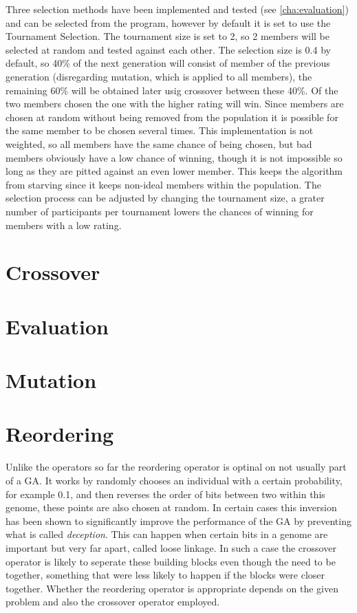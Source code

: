 Three selection methods have been implemented and tested (see \ref{cha:evaluation}) and can be selected from the program, however by default it is set to use the Tournament Selection. The tournament size is set to 2, so 2 members will be selected at random and tested against each other. The selection size is 0.4 by default, so 40\% of the next generation will consist of member of the previous generation (disregarding mutation, which is applied to all members), the remaining 60\% will be obtained later usig crossover between these 40\%. Of the two members chosen the one with the higher rating will win. Since members are chosen at random without being removed from the population it is possible for the same member to be chosen several times. This implementation is not weighted, so all members have the same chance of being chosen, but bad members obviously have a low chance of winning, though it is not impossible so long as they are pitted against an even lower member. This keeps the algorithm from starving since it keeps non-ideal members within the population. The selection process can be adjusted by changing the tournament size, a grater number of participants per tournament lowers the chances of winning for members with a low rating.

\section{Crossover} %
\label{sec:crossover}



\section{Evaluation} %
\label{sec:evaluation}



\section{Mutation} %
\label{sec:mutation}



\section{Reordering}
\label{sec:reordering}

Unlike the operators so far the reordering operator is optinal on not usually part of a GA. It works by randomly chooses an individual with a certain probability, for example 0.1, and then reverses the order of bits between two within this genome, these points are also chosen at random. In certain cases this inversion has been shown to significantly improve the performance of the GA by preventing what is called \textit{deception}\cite{8}. This can happen when certain bits in a genome are important but very far apart, called loose linkage. In such a case the crossover operator is likely to seperate these building blocks even though the need to be together, something that were less likely to happen if the blocks were closer together. Whether the reordering operator is appropriate depends on the given problem and also the crossover operator employed.
